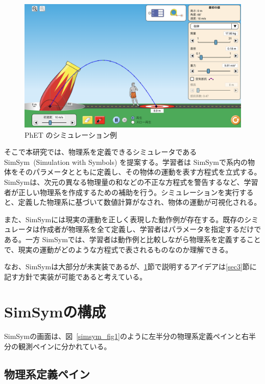 \documentclass[11pt, a4paper, oneside, twocolumn, dvipdfmx]{jsarticle}
\newcommand{\simname}{SimSym}
\newcommand{\simnamealt}{Simulation with Symbols}
\begin{document}
\begin{figure}[thb]
\centering
\includegraphics*[width=0.9\linewidth]{figure/PhET_example.png}
\caption{PhET のシミュレーション例} \label{numeral_based}
\end{figure}

そこで本研究では、物理系を定義できるシミュレータである \simname~(\simnamealt) を提案する。学習者は \simname で系内の物体をそのパラメータとともに定義し、その物体の運動を表す方程式を立式する。\simname は、次元の異なる物理量の和などの不正な方程式を警告するなど、学習者が正しい物理系を作成するための補助を行う。シミュレーションを実行すると、定義した物理系に基づいて数値計算がなされ、物体の運動が可視化される。

また、\simname には現実の運動を正しく表現した動作例が存在する。既存のシミュレータは作成者が物理系を全て定義し、学習者はパラメータを指定するだけである。一方 \simname では、学習者は動作例と比較しながら物理系を定義することで、現実の運動がどのような方程式で表されるものなのか理解できる。

なお、\simname は大部分が未実装であるが、\ref{sec2}節で説明するアイデアは\ref{sec3}節に記す方針で実装が可能であると考えている。

\section{\simname の構成} \label{sec2}

\simname の画面は、図~\ref{simsym_fig1}のように左半分の物理系定義ペインと右半分の観測ペインに分かれている。

\subsection*{物理系定義ペイン}
\end{document}
